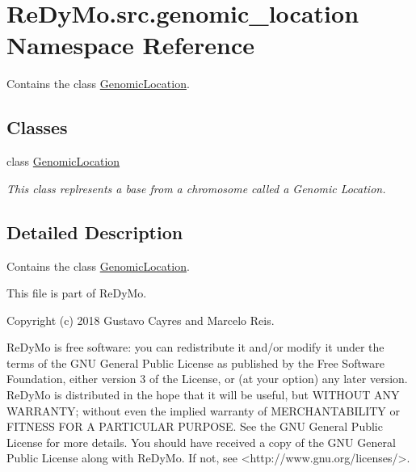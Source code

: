 \hypertarget{namespaceReDyMo_1_1src_1_1genomic__location}{}\section{Re\+Dy\+Mo.\+src.\+genomic\+\_\+location Namespace Reference}
\label{namespaceReDyMo_1_1src_1_1genomic__location}


Contains the class \mbox{\hyperlink{classReDyMo_1_1src_1_1genomic__location_1_1GenomicLocation}{Genomic\+Location}}.  


\subsection*{Classes}
\begin{DoxyCompactItemize}
\item 
class \mbox{\hyperlink{classReDyMo_1_1src_1_1genomic__location_1_1GenomicLocation}{Genomic\+Location}}
\begin{DoxyCompactList}\small\item\em This class replresents a base from a chromosome called a Genomic Location. \end{DoxyCompactList}\end{DoxyCompactItemize}


\subsection{Detailed Description}
Contains the class \mbox{\hyperlink{classReDyMo_1_1src_1_1genomic__location_1_1GenomicLocation}{Genomic\+Location}}. 

\begin{DoxyVerb}This file is part of ReDyMo.

    Copyright (c) 2018  Gustavo Cayres and Marcelo Reis.

    ReDyMo is free software: you can redistribute it and/or modify it
    under the terms of the GNU General Public License as published by the
    Free Software Foundation, either version 3 of the License, or (at your
    option) any later version.
    ReDyMo is distributed in the hope that it will be useful, but WITHOUT
    ANY WARRANTY; without even the implied warranty of MERCHANTABILITY or
    FITNESS FOR A PARTICULAR PURPOSE. See the GNU General Public License
    for more details.
    You should have received a copy of the GNU General Public License along
    with ReDyMo. If not, see <http://www.gnu.org/licenses/>.\end{DoxyVerb}
